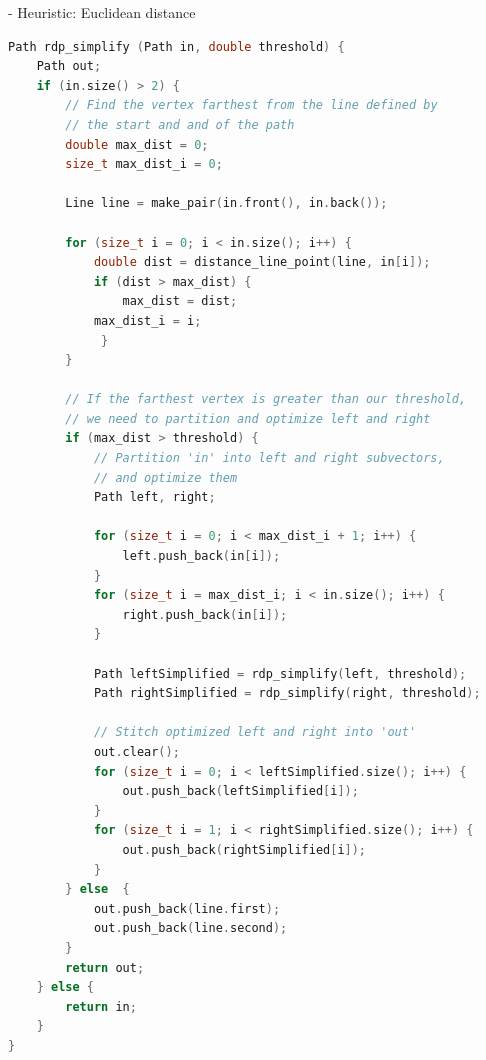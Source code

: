 \documentclass[titlepage,12pt,a4paper]{article}
\begin{document}
- Heuristic: Euclidean distance


\pagebreak


\begin{lstlisting}[language=C++]
Path rdp_simplify (Path in, double threshold) {
    Path out;
    if (in.size() > 2) {
        // Find the vertex farthest from the line defined by 
        // the start and and of the path
        double max_dist = 0;
        size_t max_dist_i = 0;

        Line line = make_pair(in.front(), in.back());

        for (size_t i = 0; i < in.size(); i++) {
            double dist = distance_line_point(line, in[i]);
            if (dist > max_dist) {
                max_dist = dist;
	        max_dist_i = i;
             }
        }

        // If the farthest vertex is greater than our threshold,
        // we need to partition and optimize left and right
        if (max_dist > threshold) {
            // Partition 'in' into left and right subvectors,
            // and optimize them
            Path left, right;

            for (size_t i = 0; i < max_dist_i + 1; i++) {
                left.push_back(in[i]);
            }
            for (size_t i = max_dist_i; i < in.size(); i++) {
                right.push_back(in[i]);
            }

            Path leftSimplified = rdp_simplify(left, threshold);
            Path rightSimplified = rdp_simplify(right, threshold);

            // Stitch optimized left and right into 'out'
            out.clear();
            for (size_t i = 0; i < leftSimplified.size(); i++) {
                out.push_back(leftSimplified[i]);
            }
            for (size_t i = 1; i < rightSimplified.size(); i++) {
                out.push_back(rightSimplified[i]);
            }
        } else  {
            out.push_back(line.first);
            out.push_back(line.second);
        }
        return out;
    } else {
        return in;
    }
}
	
\end{lstlisting}
\end{document}
